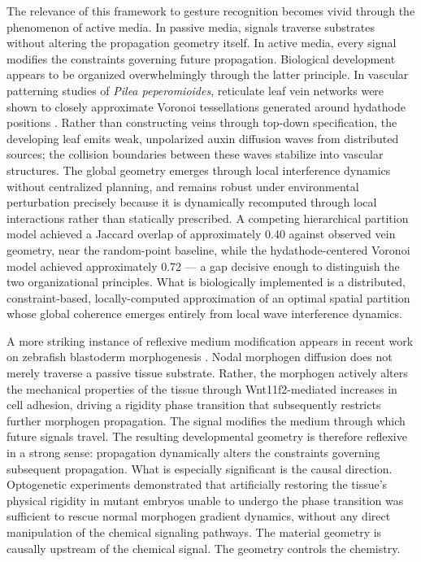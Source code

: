 \documentclass[11pt, a4paper]{article}
\theoremstyle{definition}
\begin{document}
The relevance of this framework to gesture recognition becomes vivid through the phenomenon of active media. In passive media, signals traverse substrates without altering the propagation geometry itself. In active media, every signal modifies the constraints governing future propagation. Biological development appears to be organized overwhelmingly through the latter principle. In vascular patterning studies of \textit{Pilea peperomioides}, reticulate leaf vein networks were shown to closely approximate Voronoi tessellations generated around hydathode positions \cite{zheng2026}. Rather than constructing veins through top-down specification, the developing leaf emits weak, unpolarized auxin diffusion waves from distributed sources; the collision boundaries between these waves stabilize into vascular structures. The global geometry emerges through local interference dynamics without centralized planning, and remains robust under environmental perturbation precisely because it is dynamically recomputed through local interactions rather than statically prescribed. A competing hierarchical partition model achieved a Jaccard overlap of approximately 0.40 against observed vein geometry, near the random-point baseline, while the hydathode-centered Voronoi model achieved approximately 0.72 --- a gap decisive enough to distinguish the two organizational principles. What is biologically implemented is a distributed, constraint-based, locally-computed approximation of an optimal spatial partition whose global coherence emerges entirely from local wave interference dynamics.

A more striking instance of reflexive medium modification appears in recent work on zebrafish blastoderm morphogenesis \cite{autorino2026}. Nodal morphogen diffusion does not merely traverse a passive tissue substrate. Rather, the morphogen actively alters the mechanical properties of the tissue through Wnt11f2-mediated increases in cell adhesion, driving a rigidity phase transition that subsequently restricts further morphogen propagation. The signal modifies the medium through which future signals travel. The resulting developmental geometry is therefore reflexive in a strong sense: propagation dynamically alters the constraints governing subsequent propagation. What is especially significant is the causal direction. Optogenetic experiments demonstrated that artificially restoring the tissue's physical rigidity in mutant embryos unable to undergo the phase transition was sufficient to rescue normal morphogen gradient dynamics, without any direct manipulation of the chemical signaling pathways. The material geometry is causally upstream of the chemical signal. The geometry controls the chemistry.
\end{document}
